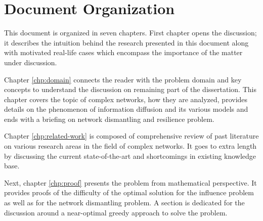 \documentclass[a4paper,10pt,times,numbered,print,index]{PhDThesisPSnPDF}
\begin{document}
	
	\frontmatter
	
	\maketitle
	
	
	
	
    
	
    
	
	
	\tableofcontents
	
	\listoftables

	\listoffigures
	
	\listofalgorithmes
	
	
	\mainmatter
	
    
    \chapter*{Document Organization}
	This document is organized in seven chapters. First chapter opens the discussion; it describes the intuition behind the research presented in this document along with motivated real-life cases which encompass the importance of the matter under discussion.
	
	Chapter \ref{chp:domain} connects the reader with the problem domain and key concepts to understand the discussion on remaining part of the dissertation. This chapter covers the topic of complex networks, how they are analyzed, provides details on the phenomenon of information diffusion and its various models and ends with a briefing on network dismantling and resilience problem.
	
	Chapter \ref{chp:related-work} is composed of comprehensive review of past literature on various research areas in the field of complex networks. It goes to extra length by discussing the current state-of-the-art and shortcomings in existing knowledge base.
	
	Next, chapter \ref{chp:proof} presents the problem from mathematical perspective. It provides proofs of the difficulty of the optimal solution for the influence problem as well as for the network dismantling problem. A section is dedicated for the discussion around a near-optimal greedy approach to solve the problem.
	
\end{document}
